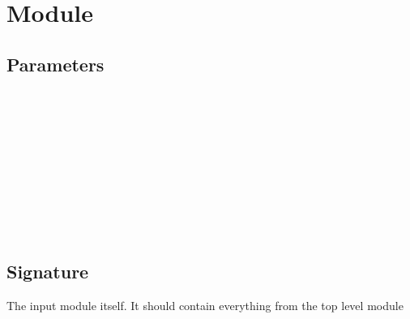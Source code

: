 \section{Module }\label{Oxcaml_functor_alias-Make}%
\subsection{Parameters\label{Oxcaml_functor_alias-Make--parameters}}%
\label{Oxcaml_functor_alias-Make--argument-1-T}\label{Oxcaml_functor_alias-Make-argument-1-T}\begin{ocamlindent}\label{Oxcaml_functor_alias-Make-argument-1-T--type-t}\\
\label{Oxcaml_functor_alias-Make-argument-1-T--type-p}\\
\label{Oxcaml_functor_alias-Make-argument-1-T--module-X}\label{Oxcaml_functor_alias-Make-argument-1-T-X}\begin{ocamlindent}\label{Oxcaml_functor_alias-Make-argument-1-T-X--type-v}\\
\end{ocamlindent}%
\\
\label{Oxcaml_functor_alias-Make-argument-1-T--module-type-S}\\
\label{Oxcaml_functor_alias-Make-argument-1-T--val-via_module_type_include}\\
\end{ocamlindent}%
\\
\subsection{Signature\label{Oxcaml_functor_alias-Make--signature}}%
\label{Oxcaml_functor_alias-Make--module-Aliased}\begin{ocamlindent}The input module itself. It should contain everything from the top level module\end{ocamlindent}%
\medbreak


